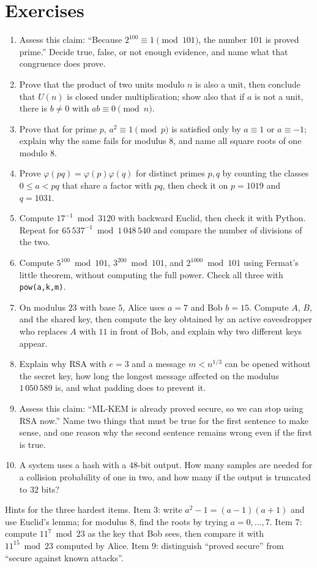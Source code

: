 \section{Exercises}
\begin{latihan}
\begin{enumerate}
  \item Assess this claim: ``Because $2^{100}\equiv1\pmod{101}$, the number $101$ is proved prime.''
        Decide true, false, or not enough evidence, and name what that congruence does prove.
  \item Prove that the product of two units modulo $n$ is also a unit, then conclude that $U(n)$ is
        closed under multiplication; show also that if $a$ is not a unit, there is $b\neq0$ with
        $ab\equiv0\pmod n$.
  \item Prove that for prime $p$, $a^2\equiv1\pmod p$ is satisfied only by $a\equiv1$ or
        $a\equiv-1$; explain why the same fails for modulus $8$, and name all square roots of one
        modulo $8$.
  \item Prove $\varphi(pq)=\varphi(p)\varphi(q)$ for distinct primes $p,q$ by counting the classes
        $0\le a<pq$ that share a factor with $pq$, then check it on $p=1019$ and $q=1031$.
  \item Compute $17^{-1}\bmod3120$ with backward Euclid, then check it with Python. Repeat for
        $65\,537^{-1}\bmod1\,048\,540$ and compare the number of divisions of the two.
  \item Compute $5^{100}\bmod101$, $3^{200}\bmod101$, and $2^{1000}\bmod101$ using Fermat's little
        theorem, without computing the full power. Check all three with \texttt{pow(a,k,m)}.
  \item On modulus $23$ with base $5$, Alice uses $a=7$ and Bob $b=15$. Compute $A$, $B$, and the
        shared key, then compute the key obtained by an active eavesdropper who replaces $A$ with
        $11$ in front of Bob, and explain why two different keys appear.
  \item Explain why RSA with $e=3$ and a message $m<n^{1/3}$ can be opened without the secret key,
        how long the longest message affected on the modulus $1\,050\,589$ is, and what padding does
        to prevent it.
  \item Assess this claim: ``ML-KEM is already proved secure, so we can stop using RSA now.'' Name
        two things that must be true for the first sentence to make sense, and one reason why the
        second sentence remains wrong even if the first is true.
  \item A system uses a hash with a $48$-bit output. How many samples are needed for a collision
        probability of one in two, and how many if the output is truncated to $32$ bits?
\end{enumerate}

Hints for the three hardest items. Item 3: write $a^2-1=(a-1)(a+1)$ and use Euclid's lemma; for
modulus $8$, find the roots by trying $a=0,\dots,7$. Item 7: compute $11^7\bmod23$ as the key that
Bob sees, then compare it with $11^{15}\bmod23$ computed by Alice. Item 9: distinguish ``proved
secure'' from ``secure against known attacks''.
\end{latihan}

